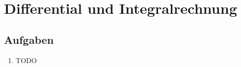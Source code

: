 \chapter{Differential und Integralrechnung}

\section{Aufgaben}
\begin{enumerate}
\item TODO
\end{enumerate}
